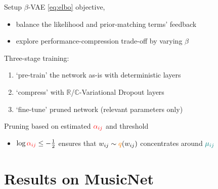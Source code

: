 \documentclass{beamer}
\newcommand{\real}{\mathbb{R}}
\newcommand{\cplx}{\mathbb{C}}
\begin{document}
\begin{frame}[c]{Setup}{\insertsection}
  $\beta$-VAE \ref{eq:elbo} objective, \citep{higgins_beta-vae_2017}
  \begin{itemize}
    \item balance the likelihood and prior-matching terms' feedback
    \item explore performance-compression trade-off by varying $\beta$
  \end{itemize}

  \bigskip
  Three-stage training:
  \begin{enumerate}
    \item `pre-train' the network as-is with deterministic layers
    \item `compress' with $\real$/$\cplx$-Variational Dropout layers
    \item `fine-tune' pruned network (relevant parameters only)
  \end{enumerate}

  \bigskip
  Pruning based on estimated ${\color{red} \alpha_{ij}}$ and threshold
  \begin{itemize}
    \item $
      \log{{\color{red} \alpha_{ij}}} \leq -\tfrac12
    $ ensures that $
      w_{ij} \sim {\color{orange} q}(w_{ij})
    $ concentrates around ${\color{teal} \mu_{ij}}$
  \end{itemize}
\end{frame}


\section{Results on MusicNet} %
\label{sec:results_on_musicnet}
\end{document}
